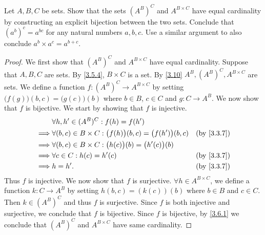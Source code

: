 \begin{exercise}\label{ex 3.6.6}
  Let \(A, B, C\) be sets.
  Show that the sets \((A^B)^C\) and \(A^{B \times C}\) have equal cardinality by constructing an explicit bijection between the two sets.
  Conclude that \((a^b)^c = a^{bc}\) for any natural numbers \(a, b, c\).
  Use a similar argument to also conclude \(a^b \times a^c = a^{b+c}\).
\end{exercise}

\begin{proof}
  We first show that \((A^B)^C\) and \(A^{B \times C}\) have equal cardinality.
  Suppose that \(A, B, C\) are sets.
  By \cref{3.5.4}, \(B \times C\) is a set.
  By \cref{3.10} \(A^B, (A^B)^C, A^{B \times C}\) are sets.
  We define a function \(f : (A^B)^C \to A^{B \times C}\) by setting \(\big(f(g)\big)(b, c) = \big(g(c)\big)(b)\) where \(b \in B\), \(c \in C\) and \(g : C \to A^B\).
  We now show that \(f\) is bijective.
  We start by showing that \(f\) is injective.
  \begin{align*}
             & \forall h, h' \in (A^B)^C : f(h) = f(h')                                                                \\
    \implies & \forall (b, c) \in B \times C : \big(f(h)\big)(b, c) = \big(f(h')\big)(b, c) & \text{(by \cref{3.3.7})} \\
    \implies & \forall (b, c) \in B \times C : \big(h(c)\big)(b) = \big(h'(c)\big)(b)                                  \\
    \implies & \forall c \in C : h(c) = h'(c)                                               & \text{(by \cref{3.3.7})} \\
    \implies & h = h'.                                                                      & \text{(by \cref{3.3.7})}
  \end{align*}
  Thus \(f\) is injective.
  We now show that \(f\) is surjective.
  \(\forall h \in A^{B \times C}\), we define a function \(k : C \to A^B\) by setting \(h(b, c) = (k(c))(b)\) where \(b \in B\) and \(c \in C\).
  Then \(k \in (A^B)^C\) and thus \(f\) is surjective.
  Since \(f\) is both injective and surjective, we conclude that \(f\) is bijective.
  Since \(f\) is bijective, by \cref{3.6.1} we conclude that \((A^B)^C\) and \(A^{B \times C}\) have same cardinality.


\end{proof}
